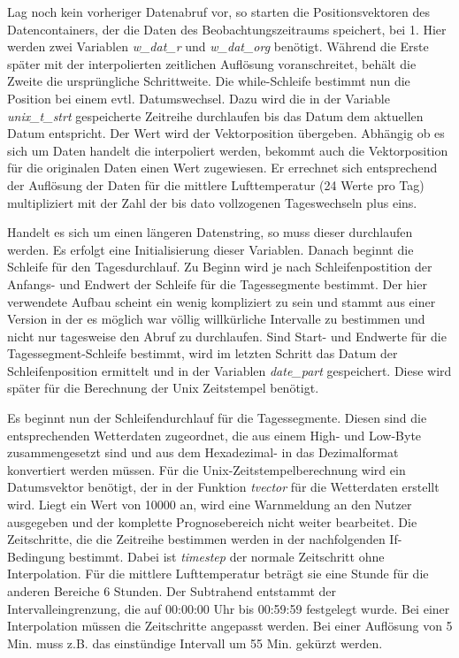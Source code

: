 
Lag noch kein vorheriger Datenabruf vor, so starten die Positionsvektoren des Datencontainers, der die Daten des Beobachtungszeitraums speichert, bei 1. Hier werden zwei Variablen \textit{w\_dat\_r} und \textit{w\_dat\_org} benötigt. Während die Erste später mit der interpolierten zeitlichen Auflösung voranschreitet, behält die Zweite die ursprüngliche Schrittweite. Die while-Schleife bestimmt nun die Position bei einem evtl. Datumswechsel. Dazu wird die in der Variable \textit{unix\_t\_strt} gespeicherte Zeitreihe durchlaufen bis das Datum dem aktuellen Datum entspricht. Der Wert wird der Vektorposition übergeben. Abhängig ob es sich um Daten handelt die interpoliert werden, bekommt auch die Vektorposition für die originalen Daten einen Wert zugewiesen. Er errechnet sich entsprechend der Auflösung der Daten für die mittlere Lufttemperatur (24 Werte pro Tag) multipliziert mit der Zahl der bis dato vollzogenen Tageswechseln plus eins.      

Handelt es sich um einen längeren Datenstring, so muss dieser durchlaufen werden. Es erfolgt eine Initialisierung dieser Variablen. Danach beginnt die Schleife für den Tagesdurchlauf. Zu Beginn wird je nach Schleifenpostition der Anfangs- und Endwert der Schleife für die Tagessegmente bestimmt. Der hier verwendete Aufbau scheint ein wenig kompliziert zu sein und stammt aus einer Version in der es möglich war völlig willkürliche Intervalle zu bestimmen und nicht nur tagesweise den Abruf zu durchlaufen. Sind Start- und Endwerte für die Tagessegment-Schleife bestimmt, wird im letzten Schritt das Datum der Schleifenposition ermittelt und in der Variablen \textit{date\_part} gespeichert. Diese wird später für die Berechnung der Unix Zeitstempel benötigt.  
 
Es beginnt nun der Schleifendurchlauf für die Tagessegmente. Diesen sind die entsprechenden Wetterdaten zugeordnet, die aus einem High- und Low-Byte zusammengesetzt sind und aus dem Hexadezimal- in das Dezimalformat konvertiert werden müssen. Für die Unix-Zeitstempelberechnung wird ein Datumsvektor benötigt, der in der Funktion \textit{tvector} für die Wetterdaten erstellt wird. Liegt ein Wert von 10000 an, wird eine Warnmeldung an den Nutzer ausgegeben und der komplette Prognosebereich nicht weiter bearbeitet. Die Zeitschritte, die die Zeitreihe bestimmen werden in der nachfolgenden If-Bedingung bestimmt. Dabei ist \textit{timestep} der normale Zeitschritt ohne Interpolation. Für die mittlere Lufttemperatur beträgt sie eine Stunde für die anderen Bereiche 6 Stunden. Der Subtrahend entstammt der Intervalleingrenzung, die auf 00:00:00 Uhr bis 00:59:59 festgelegt wurde. Bei einer Interpolation müssen die Zeitschritte angepasst werden. Bei einer Auflösung von 5 Min. muss z.B. das einstündige Intervall um 55 Min. gekürzt werden. 
